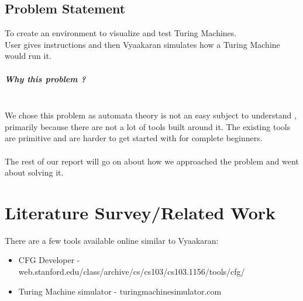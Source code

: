 \documentclass[12pt]{report}
\begin{document}
\section{Problem Statement}
To create an environment to visualize and test Turing Machines.\\
User gives instructions and then Vyaakaran simulates how a Turing Machine
would run it.
\paragraph{Why this problem ?\\\\}
We chose this problem as automata theory is not an easy subject to understand , primarily because there are not a lot of tools built around it. The existing tools are primitive and are harder to get started with for complete beginners.
\\\\
The rest of our report will go on about how we approached the problem and went about solving it.

\chapter{Literature Survey/Related Work} 

There are a few tools available online similar to Vyaakaran:\\
\begin{itemize}
\item CFG Developer - web.stanford.edu/class/archive/cs/cs103/cs103.1156/tools/cfg/\\
\item Turing Machine simulator -  turingmachinesimulator.com\\
\end{itemize}
\end{document}
